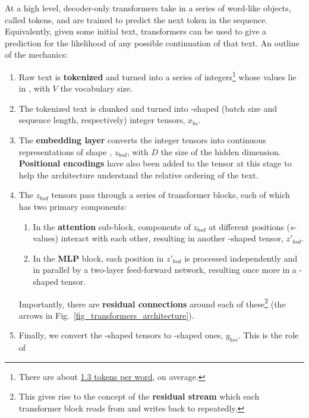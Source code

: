 \documentclass[11pt]{article}
\begin{document}
At a high level, decoder-only transformers take in a series of word-like objects, called tokens, and
are trained to predict the next token in the sequence. Equivalently, given some initial text,
transformers can be used to give a prediction for the likelihood of any possible continuation of that
text. An outline of the mechanics:
\begin{enumerate}
	\item Raw text is \textbf{tokenized} and turned into a series of integers\footnote{There are
		      about \href{https://github.com/ray-project/llm-numbers}{1.3 tokens per word}, on average.} whose values lie in , with $ V $ the vocabulary
	      size.
	\item The tokenized text is chunked and turned into -shaped (batch size and
	      sequence length, respectively) integer tensors, $ x _{ bs } $.
	\item The \textbf{embedding layer} converts the integer tensors into continuous representations of shape
	      , $ z _{ bsd } $, with $ D $ the size of the hidden dimension.
	      \textbf{Positional encodings} have also been added to the tensor at this stage to help the
	      architecture understand the relative ordering of the text.
	\item The $ z _{ bsd } $ tensors pass through a series of transformer blocks, each of which has
	      two primary components:
	      \begin{enumerate}
		      \item In the \textbf{attention} sub-block, components of $ z _{ bsd } $ at different
		            positions ($ s $-values) interact with each other, resulting in another -shaped
		            tensor, $  z' _{ bsd } $.
		      \item In the \textbf{MLP} block, each position in  $ z' _{ bsd } $ is processed
		            independently and in parallel by a two-layer feed-forward network, resulting once more
		            in a -shaped tensor.
	      \end{enumerate}
	      Importantly, there are \textbf{residual connections} around each of these\footnote{This
		      gives rise to the concept of the \textbf{residual stream} which each transformer block reads
		      from and writes back to repeatedly.} (the arrows in Fig.~\ref{fig_transformers_architecture}).
	\item Finally, we convert the -shaped
	      tensors to -shaped ones, $ y _{ bsv } $. This is the role of

\end{enumerate}
\end{document}

